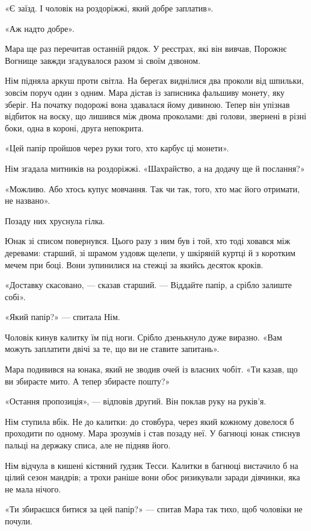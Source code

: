 \documentclass[10pt,a4paper]{article}
\begin{document}
«Є заїзд. І чоловік на роздоріжжі, який добре заплатив».

«Аж надто добре».

Мара ще раз перечитав останній рядок. У реєстрах, які він вивчав, Порожнє Вогнище завжди згадувалося разом зі своїм дзвоном.

Нім підняла аркуш проти світла. На берегах виднілися два проколи від шпильки, зовсім поруч один з одним. Мара дістав із записника фальшиву монету, яку зберіг. На початку подорожі вона здавалася йому дивиною. Тепер він упізнав відбиток на воску, що лишився між двома проколами: дві голови, звернені в різні боки, одна в короні, друга непокрита.

«Цей папір пройшов через руки того, хто карбує ці монети».

Нім згадала митників на роздоріжжі. «Шахрайство, а на додачу ще й послання?»

«Можливо. Або хтось купує мовчання. Так чи так, того, хто має його отримати, не названо».

Позаду них хруснула гілка.

Юнак зі списом повернувся. Цього разу з ним був і той, хто тоді ховався між деревами: старший, зі шрамом уздовж щелепи, у шкіряній куртці й з коротким мечем при боці. Вони зупинилися на стежці за якийсь десяток кроків.

«Доставку скасовано, --- сказав старший. --- Віддайте папір, а срібло залиште собі».

«Який папір?» --- спитала Нім.

Чоловік кинув калитку їм під ноги. Срібло дзенькнуло дуже виразно. «Вам можуть заплатити двічі за те, що ви не ставите запитань».

Мара подивився на юнака, який не зводив очей із власних чобіт. «Ти казав, що ви збираєте мито. А тепер збираєте пошту?»

«Остання пропозиція», --- відповів другий. Він поклав руку на руків’я.

Нім ступила вбік. Не до калитки: до стовбура, через який кожному довелося б проходити по одному. Мара зрозумів і став позаду неї. У багнюці юнак стиснув пальці на держаку списа, але не підняв його.

Нім відчула в кишені кістяний ґудзик Тесси. Калитки в багнюці вистачило б на цілий сезон мандрів; а трохи раніше вони обоє ризикували заради дівчинки, яка не мала нічого.

«Ти збираєшся битися за цей папір?» --- спитав Мара так тихо, щоб чоловіки не почули.
\end{document}
